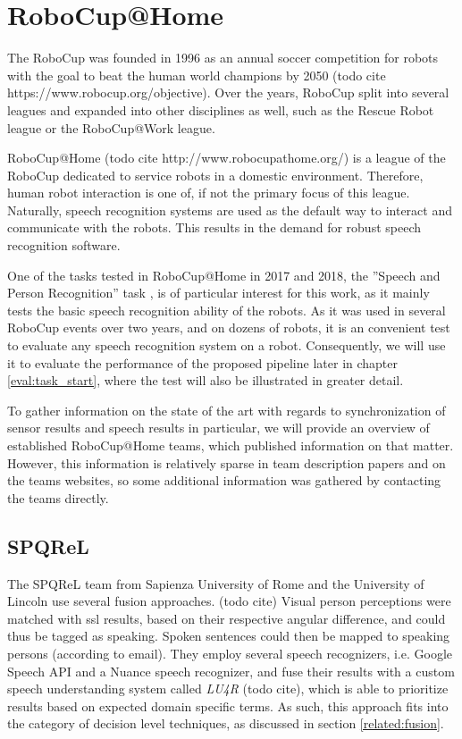 
\section{RoboCup@Home}
The RoboCup was founded in 1996 as an annual soccer competition for robots with the goal to beat the human world champions by 2050 (todo cite https://www.robocup.org/objective).
Over the years, RoboCup split into several leagues and expanded into other disciplines as well, such as the Rescue Robot league or the RoboCup@Work league.

RoboCup@Home (todo cite http://www.robocupathome.org/) is a league of the RoboCup dedicated to service robots in a domestic environment. %
Therefore, human robot interaction is one of, if not the primary focus of this league.
Naturally, speech recognition systems are used as the default way to interact and communicate with the robots.
This results in the demand for robust speech recognition software.%

One of the tasks tested in RoboCup@Home in 2017 and 2018, the ''Speech and Person Recognition'' task \cite{rulebook_2018}, is of particular interest for this work, as it mainly tests the basic speech recognition ability of the robots. 
As it was used in several RoboCup events over two years, and on dozens of robots, it is an convenient test to evaluate any speech recognition system on a robot.
Consequently, we will use it to evaluate the performance of the proposed pipeline later in chapter \ref{eval:task_start}, where the test will also be illustrated in greater detail. 

To gather information on the state of the art with regards to synchronization of sensor results and speech results in particular, we will provide an overview of established RoboCup@Home teams, which published information on that matter.
However, this information is relatively sparse in team description papers and on the teams websites, so some additional information was gathered by contacting the teams directly.

\subsection{SPQReL}
The SPQReL team from Sapienza University of Rome and the University of Lincoln use several fusion approaches. (todo cite)
Visual person perceptions were matched with \gls{ssl} results, based on their respective angular difference, and could thus be tagged as speaking.
Spoken sentences could then be mapped to speaking persons (according to email).
They employ several speech recognizers, i.e. Google Speech API and a Nuance speech recognizer, and fuse their results with a custom speech understanding system called \textit{LU4R} (todo cite), which is able to prioritize results based on expected domain specific terms. 
As such, this approach fits into the category of decision level techniques, as discussed in section \ref{related:fusion}.

